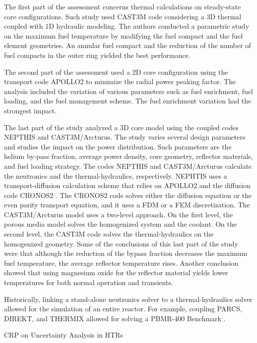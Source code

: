 \documentclass[11pt,letterpaper]{article}
\begin{document}
The first part of the assessment concerns thermal calculations on steady-state core configurations.
Such study used CAST3M \cite{studer_cast3marcturus_2007} code considering a 3D thermal coupled with 1D hydraulic modeling.
The authors conducted a parametric study on the maximum fuel temperature by modifying the fuel compact and the fuel element geometries.
An annular fuel compact and the reduction of the number of fuel compacts in the outer ring yielded the best performance.

The second part of the assessment used a 2D core configuration using the transport code APOLLO2 \cite{sanchez_apollo2_1999} to minimize the radial power peaking factor.
The analysis included the variation of various parameters such as fuel enrichment, fuel loading, and the fuel management scheme.
The fuel enrichment variation had the strongest impact.

The last part of the study analyzed a 3D core model using the coupled codes NEPTHIS \cite{cavalier_presentation_2005} and CAST3M/Arcturus.
The study varies several design parameters and studies the impact on the power distribution.
Such parameters are the helium by-pass fraction, average power density, core geometry, reflector materials, and fuel loading strategy.
The codes NEPTHIS and CAST3M/Arcturus calculate the neutronics and the thermal-hydraulics, respectively.
NEPHTIS uses a transport-diffusion calculation scheme that relies on APOLLO2 and the diffusion code CRONOS2 \cite{lautard_cronos_1990}.
The CRONOS2 code solves either the diffusion equation or the even parity transport equation, and it uses a \gls{FDM} or a \gls{FEM} discretization.
The CAST3M/Arcturus model uses a two-level approach.
On the first level, the porous media model solves the homogenized system and the coolant.
On the second level, the CAST3M code solves the thermal-hydraulics on the homogenized geometry.
Some of the conclusions of this last part of the study were that although the reduction of the bypass fraction decreases the maximum fuel temperature, the average reflector temperature rises.
Another conclusion showed that using magnesium oxide for the reflector material yields lower temperatures for both normal operation and transients.












Historically, linking a stand-alone neutronics solver to a thermal-hydraulics solver allowed for the simulation of an entire reactor.
For example, coupling PARCS, DIREKT, and THERMIX \cite{seker_analysis_2006} allowed for solving a \gls{PBMR}-400 Benchmark \cite{reitsma_oecdneansc_2006}.

CRP on Uncertainty Analysis in HTRs %
\cite{gougar_htgr_2016}

\pagebreak


\end{document}
